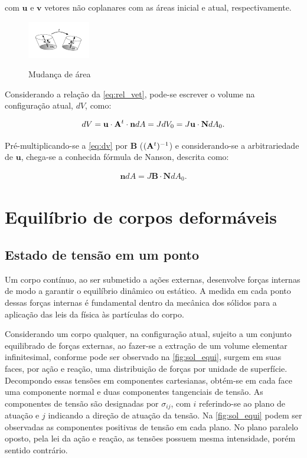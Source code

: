 \noindent com $\mathbf{u}$ e $\mathbf{v}$ vetores não coplanares com as áreas inicial e atual, respectivamente.

\begin{figure}[!htbp]
	\caption{Mudança de área}
	\centering
	\includegraphics[scale=6.0,trim=0cm 0.2cm 0cm 0cm, clip=true]{Imagens/Cap4/sol_def_area.pdf}	
	\label{fig:solido_def_area}
\end{figure}

Considerando a relação da \autoref{eq:rel_vet}, pode-se escrever o volume na configuração atual, $dV$, como:

\begin{align}
	dV = \mathbf{u} \cdot \mathbf{A}^{t} \cdot \mathbf{n} dA = J dV_0 = J \mathbf{u} \cdot \mathbf{N} dA_0. \label{eq:dv}
\end{align}

Pré-multiplicando-se a \autoref{eq:dv} por $\mathbf{B}$ ($(\mathbf{A}^{t})^{-1}$) e considerando-se a arbitrariedade de $\mathbf{u}$, chega-se a conhecida fórmula de Nanson, descrita como:

\begin{align}
\mathbf{n}dA = J \mathbf{B} \cdot \mathbf{N} dA_{0}. \label{eq:Nanson}
\end{align}


\section{Equilíbrio de corpos deformáveis} \label{capitulo:Cap3:EquilibrioCorposDeformaveis}

\subsection{Estado de tensão em um ponto}

Um corpo contínuo, ao ser submetido a ações externas, desenvolve forças internas de modo a garantir o equilíbrio dinâmico ou estático. A medida em cada ponto dessas forças internas é fundamental dentro da mecânica dos sólidos para a aplicação das leis da física às partículas do corpo.

Considerando um corpo qualquer, na configuração atual, sujeito a um conjunto equilibrado de forças externas, ao fazer-se a extração de um volume elementar infinitesimal, conforme pode ser observado na \autoref{fig:sol_equi}, surgem em suas faces, por ação e reação, uma distribuição de forças por unidade de superfície. Decompondo essas tensões em componentes cartesianas, obtém-se em cada face uma componente normal e duas componentes tangenciais de tensão. As componentes de tensão são designadas por $\sigma_{ij}$, com $i$ referindo-se ao plano de atuação e $j$ indicando a direção de atuação da tensão. Na \autoref{fig:sol_equi} podem ser observadas as componentes positivas de tensão em cada plano. No plano paralelo oposto, pela lei da ação e reação, as tensões possuem mesma intensidade, porém sentido contrário.

